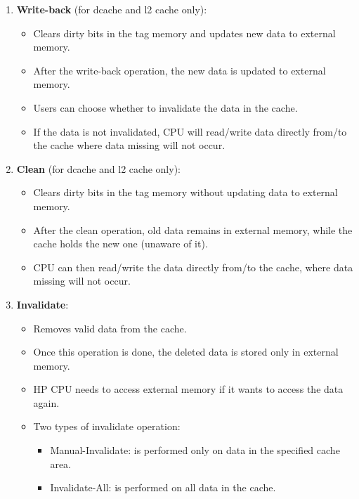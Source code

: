 \documentclass[main\_\_EN.tex]{subfiles}
\begin{document}
\begin{enumerate}
    \item \textbf{Write-back} (for dcache and l2 cache only):
    \begin{itemize}
        \item Clears dirty bits in the tag memory and updates new data to external memory.
        \item After the write-back operation, the new data is updated to external memory.
        \item Users can choose whether to invalidate the data in the cache.
        \item If the data is not invalidated, CPU will read/write data directly from/to the cache where data missing will not occur.
    \end{itemize}

    \item \textbf{Clean} (for dcache and l2 cache only):
    \begin{itemize}
        \item Clears dirty bits in the tag memory without updating data to external memory.
        \item After the clean operation, old data remains in external memory, while the cache holds the new one (unaware of it).
        \item CPU can then read/write the data directly from/to the cache, where data missing will not occur.
    \end{itemize}

    \item \textbf{Invalidate}:
    \begin{itemize}
        \item Removes valid data from the cache.
        \item Once this operation is done, the deleted data is stored only in external memory.
        \item HP CPU needs to access external memory if it wants to access the data again.
        \item Two types of invalidate operation:
        \begin{itemize}
            \item Manual-Invalidate: is performed only on data in the specified cache area.
            \item Invalidate-All: is performed on all data in the cache.
        \end{itemize}
    \end{itemize}


\end{enumerate}
\end{document}
